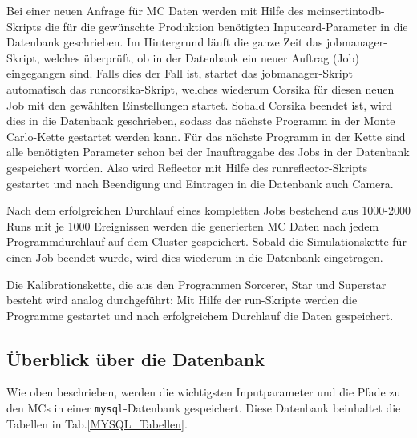 Bei einer neuen Anfrage für MC Daten werden mit Hilfe des mcinsertintodb-Skripts die für die gewünschte Produktion benötigten Inputcard-Parameter in die Datenbank geschrieben.
Im Hintergrund läuft die ganze Zeit das jobmanager-Skript, welches überprüft, ob in der Datenbank ein neuer Auftrag (Job) eingegangen sind.
Falls dies der Fall ist, startet das jobmanager-Skript automatisch das runcorsika-Skript, welches wiederum Corsika für diesen neuen Job mit den gewählten Einstellungen startet.
Sobald Corsika beendet ist, wird dies in die Datenbank geschrieben, sodass das nächste Programm in der Monte Carlo-Kette gestartet werden kann.
Für das nächste Programm in der Kette sind alle benötigten Parameter schon bei der Inauftraggabe des Jobs in der Datenbank gespeichert worden.
Also wird Reflector mit Hilfe des runreflector-Skripts gestartet und nach Beendigung und Eintragen in die Datenbank auch Camera.

Nach dem erfolgreichen Durchlauf eines kompletten Jobs  bestehend aus 1000-2000 Runs mit je 1000 Ereignissen werden die generierten MC Daten nach jedem Programmdurchlauf auf dem Cluster gespeichert.
Sobald die Simulationskette für einen Job beendet wurde, wird dies wiederum in die Datenbank eingetragen.

Die Kalibrationskette, die aus den Programmen Sorcerer, Star und Superstar besteht wird analog durchgeführt:
Mit Hilfe der run-Skripte werden die Programme gestartet und nach erfolgreichem Durchlauf die Daten gespeichert.

\subsection{Überblick über die Datenbank}
Wie oben beschrieben, werden die wichtigsten Inputparameter und die Pfade zu den MCs in einer \texttt{mysql}-Datenbank gespeichert.
Diese Datenbank beinhaltet die Tabellen in Tab.\ref{MYSQL_Tabellen}.

